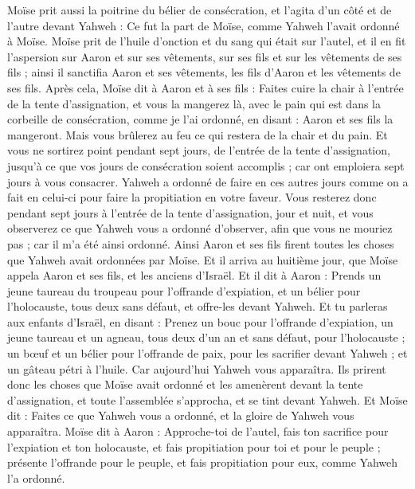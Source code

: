 \begin{multicols}{2}
Moïse prit aussi la poitrine du bélier de consécration, et l'agita d'un côté et de l'autre devant Yahweh : Ce fut la part de Moïse, comme Yahweh l'avait ordonné à Moïse.
Moïse prit de l'huile d'onction et du sang qui était sur l'autel, et il en fit l'aspersion sur Aaron et sur ses vêtements, sur ses fils et sur les vêtements de ses fils ; ainsi il sanctifia Aaron et ses vêtements, les fils d'Aaron et les vêtements de ses fils.
Après cela, Moïse dit à Aaron et à ses fils : Faites cuire la chair à l'entrée de la tente d'assignation, et vous la mangerez là, avec le pain qui est dans la corbeille de consécration, comme je l'ai ordonné, en disant : Aaron et ses fils la mangeront.
Mais vous brûlerez au feu ce qui restera de la chair et du pain.
Et vous ne sortirez point pendant sept jours, de l'entrée de la tente d'assignation, jusqu'à ce que vos jours de consécration soient accomplis ; car ont emploiera sept jours à vous consacrer.
Yahweh a ordonné de faire en ces autres jours comme on a fait en celui-ci pour faire la propitiation en votre faveur.
Vous resterez donc pendant sept jours à l'entrée de la tente d'assignation, jour et nuit, et vous observerez ce que Yahweh vous a ordonné d'observer, afin que vous ne mouriez pas ; car il m'a été ainsi ordonné.
Ainsi Aaron et ses fils firent toutes les choses que Yahweh avait ordonnées par Moïse.
\VerseOne{}Et il arriva au huitième jour, que Moïse appela Aaron et ses fils, et les anciens d'Israël.
Et il dit à Aaron : Prends un jeune taureau du troupeau pour l'offrande d'expiation, et un bélier pour l'holocauste, tous deux sans défaut, et offre-les devant Yahweh.
Et tu parleras aux enfants d'Israël, en disant : Prenez un bouc pour l'offrande d'expiation, un jeune taureau et un agneau, tous deux d'un an et sans défaut, pour l'holocauste ;
un bœuf et un bélier pour l'offrande de paix, pour les sacrifier devant Yahweh ; et un gâteau pétri à l'huile. Car aujourd'hui Yahweh vous apparaîtra.
Ils prirent donc les choses que Moïse avait ordonné et les amenèrent devant la tente d'assignation, et toute l'assemblée s'approcha, et se tint devant Yahweh.
Et Moïse dit : Faites ce que Yahweh vous a ordonné, et la gloire de Yahweh vous apparaîtra.
Moïse dit à Aaron : Approche-toi de l'autel, fais ton sacrifice pour l'expiation et ton holocauste, et fais propitiation pour toi et pour le peuple ; présente l'offrande pour le peuple, et fais propitiation pour eux, comme Yahweh l'a ordonné.

\end{multicols}
